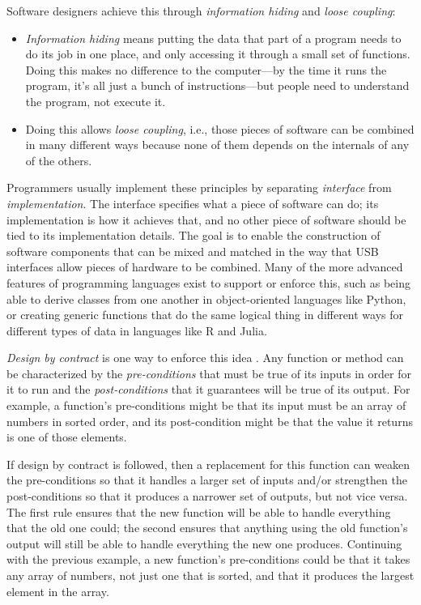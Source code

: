 \documentclass[10pt,letterpaper]{article}
\begin{document}
Software designers achieve this through \emph{information hiding}
and \emph{loose coupling}:

\begin{itemize}

\item
  \emph{Information hiding} means
  putting the data that part of a program needs to do its job in one place,
  and only accessing it through a small set of functions.
  Doing this makes no difference to the computer---by the time it runs the program,
  it's all just a bunch of instructions---but
  people need to understand the program,
  not execute it.

\item
  Doing this allows \emph{loose coupling},
  i.e.,
  those pieces of software can be combined in many different ways
  because none of them depends on the internals of any of the others.

\end{itemize}

Programmers usually implement these principles
by separating \emph{interface} from \emph{implementation}.
The interface specifies what a piece of software can do;
its implementation is how it achieves that,
and no other piece of software should be tied to its implementation details.
The goal is to enable the construction of software components
that can be mixed and matched in the way that USB interfaces allow pieces of hardware to be combined.
Many of the more advanced features of programming languages exist to support or enforce this,
such as being able to derive classes from one another in object-oriented languages like Python,
or creating generic functions that do the same logical thing in different ways for different types of data in languages like R and Julia.

\emph{Design by contract} is one way to enforce this idea \cite{Meyer1994}.
Any function or method can be characterized by
the \emph{pre-conditions} that must be true of its inputs in order for it to run
and the \emph{post-conditions} that it guarantees will be true of its output.
For example,
a function's pre-conditions might be that its input must be
an array of numbers in sorted order,
and its post-condition might be that
the value it returns is one of those elements.

If design by contract is followed,
then a replacement for this function can weaken the pre-conditions
so that it handles a larger set of inputs
and/or strengthen the post-conditions
so that it produces a narrower set of outputs,
but not vice versa.
The first rule ensures that the new function will be able to handle
everything that the old one could;
the second ensures that anything using the old function's output
will still be able to handle everything the new one produces.
Continuing with the previous example,
a new function's pre-conditions could be that it takes any array of numbers,
not just one that is sorted,
and that it produces the largest element in the array.
\end{document}
